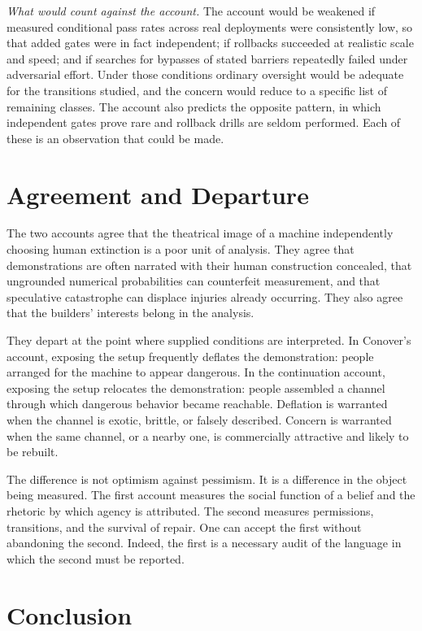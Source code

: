 \documentclass[11pt]{article}
\theoremstyle{definition}
\begin{document}
\emph{What would count against the account.} The account would be weakened if measured conditional pass rates across real deployments were consistently low, so that added gates were in fact independent; if rollbacks succeeded at realistic scale and speed; and if searches for bypasses of stated barriers repeatedly failed under adversarial effort. Under those conditions ordinary oversight would be adequate for the transitions studied, and the concern would reduce to a specific list of remaining classes. The account also predicts the opposite pattern, in which independent gates prove rare and rollback drills are seldom performed. Each of these is an observation that could be made.

\section{Agreement and Departure}

The two accounts agree that the theatrical image of a machine independently choosing human extinction is a poor unit of analysis. They agree that demonstrations are often narrated with their human construction concealed, that ungrounded numerical probabilities can counterfeit measurement, and that speculative catastrophe can displace injuries already occurring. They also agree that the builders' interests belong in the analysis.

They depart at the point where supplied conditions are interpreted. In Conover's account, exposing the setup frequently deflates the demonstration: people arranged for the machine to appear dangerous. In the continuation account, exposing the setup relocates the demonstration: people assembled a channel through which dangerous behavior became reachable. Deflation is warranted when the channel is exotic, brittle, or falsely described. Concern is warranted when the same channel, or a nearby one, is commercially attractive and likely to be rebuilt.

The difference is not optimism against pessimism. It is a difference in the object being measured. The first account measures the social function of a belief and the rhetoric by which agency is attributed. The second measures permissions, transitions, and the survival of repair. One can accept the first without abandoning the second. Indeed, the first is a necessary audit of the language in which the second must be reported.

\section{Conclusion}
\end{document}
